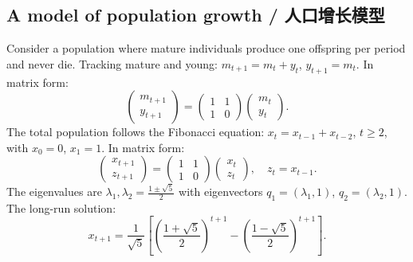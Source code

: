 \subsection{A model of population growth / 人口增长模型}

\begin{original}
Consider a population where mature individuals produce one offspring per period and never die. Tracking mature and young: $m_{t+1} = m_t + y_t$, $y_{t+1} = m_t$. In matrix form:
\[
\begin{pmatrix} m_{t+1} \\ y_{t+1} \end{pmatrix} = \begin{pmatrix} 1 & 1 \\ 1 & 0 \end{pmatrix} \begin{pmatrix} m_t \\ y_t \end{pmatrix}.
\]
The total population follows the Fibonacci equation: $x_t = x_{t-1} + x_{t-2}$, $t \ge 2$, with $x_0 = 0$, $x_1 = 1$. In matrix form:
\[
\begin{pmatrix} x_{t+1} \\ z_{t+1} \end{pmatrix} = \begin{pmatrix} 1 & 1 \\ 1 & 0 \end{pmatrix} \begin{pmatrix} x_t \\ z_t \end{pmatrix}, \quad z_t = x_{t-1}.
\]
The eigenvalues are $\lambda_1, \lambda_2 = \frac{1 \pm \sqrt{5}}{2}$ with eigenvectors $q_1 = (\lambda_1, 1)$, $q_2 = (\lambda_2, 1)$. The long-run solution:
\[
x_{t+1} = \frac{1}{\sqrt{5}}\left[\left(\frac{1+\sqrt{5}}{2}\right)^{t+1} - \left(\frac{1-\sqrt{5}}{2}\right)^{t+1}\right].
\]
\end{original}
